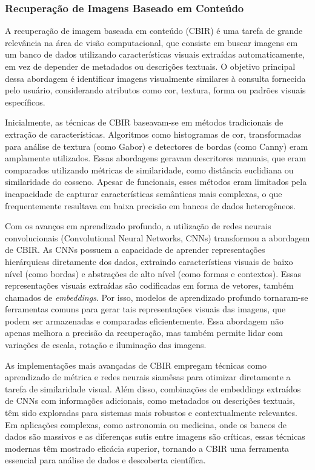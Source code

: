 \subsubsection{Recuperação de Imagens Baseado em Conteúdo}
\label{sec:cbir}

A recuperação de imagem baseada em conteúdo (CBIR) é uma tarefa de grande relevância na área de visão computacional, que consiste em buscar imagens em um banco de dados utilizando características visuais extraídas automaticamente, em vez de depender de metadados ou descrições textuais. O objetivo principal dessa abordagem é identificar imagens visualmente similares à consulta fornecida pelo usuário, considerando atributos como cor, textura, forma ou padrões visuais específicos.

Inicialmente, as técnicas de CBIR baseavam-se em métodos tradicionais de extração de características. Algoritmos como histogramas de cor, transformadas para análise de textura (como Gabor) e detectores de bordas (como Canny) eram amplamente utilizados. Essas abordagens geravam descritores manuais, que eram comparados utilizando métricas de similaridade, como distância euclidiana ou similaridade do cosseno. Apesar de funcionais, esses métodos eram limitados pela incapacidade de capturar características semânticas mais complexas, o que frequentemente resultava em baixa precisão em bancos de dados heterogêneos.

Com os avanços em aprendizado profundo, a utilização de redes neurais convolucionais (Convolutional Neural Networks, CNNs) transformou a abordagem de CBIR. As CNNs possuem a capacidade de aprender representações hierárquicas diretamente dos dados, extraindo características visuais de baixo nível (como bordas) e abstrações de alto nível (como formas e contextos). Essas representações visuais extraídas são codificadas em forma de vetores, também chamados de \emph{embeddings}. Por isso, modelos de aprendizado profundo tornaram-se ferramentas comuns para gerar tais representações visuais das imagens, que podem ser armazenadas e comparadas eficientemente. Essa abordagem não apenas melhora a precisão da recuperação, mas também permite lidar com variações de escala, rotação e iluminação das imagens.

As implementações mais avançadas de CBIR empregam técnicas como aprendizado de métrica e redes neurais siamêsas para otimizar diretamente a tarefa de similaridade visual. Além disso, combinações de embeddings extraídos de CNNs com informações adicionais, como metadados ou descrições textuais, têm sido exploradas para sistemas mais robustos e contextualmente relevantes. Em aplicações complexas, como astronomia ou medicina, onde os bancos de dados são massivos e as diferenças sutis entre imagens são críticas, essas técnicas modernas têm mostrado eficácia superior, tornando a CBIR uma ferramenta essencial para análise de dados e descoberta científica.

